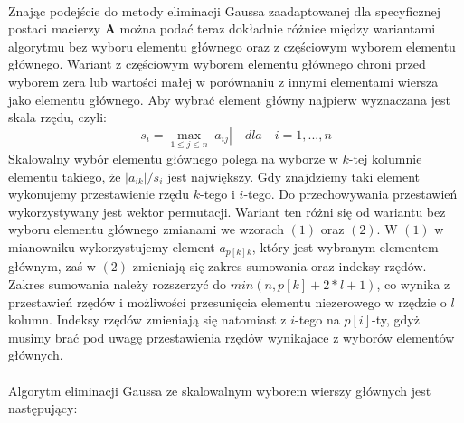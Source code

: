 \documentclass[a4paper]{article}
\begin{document}
\paragraph{}
Znając podejście do metody eliminacji Gaussa zaadaptowanej dla specyficznej postaci macierzy $\mathbf{A}$ można podać teraz dokładnie różnice między wariantami algorytmu bez wyboru elementu głównego oraz z częściowym wyborem elementu głównego.
Wariant z częściowym wyborem elementu głównego chroni przed wyborem zera lub wartości małej w porównaniu z innymi elementami wiersza jako elementu głównego. Aby wybrać element główny najpierw wyznaczana jest skala rzędu, czyli: 
\begin{equation}
s_{i} = \max_{1 \leq j \leq n} |a_{i j }| \quad dla \quad i = 1, ..., n
\end{equation}
Skalowalny wybór elementu głównego polega na wyborze w $k$-tej kolumnie elementu takiego, że $|a_{i k}| / s_{i}$ jest największy. Gdy znajdziemy taki element wykonujemy przestawienie rzędu $k$-tego i $i$-tego. Do przechowywania przestawień wykorzystywany jest wektor permutacji.
Wariant ten różni się od wariantu bez wyboru elementu głównego zmianami we wzorach $(1)$ oraz $(2)$. W $(1)$ w mianowniku wykorzystujemy element $a_{p[k] k}$, który jest wybranym elementem głównym, zaś w $(2)$ zmieniają się zakres sumowania oraz indeksy rzędów. Zakres sumowania należy rozszerzyć do $min(n, p[k] + 2*l + 1)$, co wynika z przestawień rzędów i możliwości przesunięcia elementu niezerowego w rzędzie o $l$ kolumn. Indeksy rzędów zmieniają się natomiast z $i$-tego na $p[i]$-ty, gdyż musimy brać pod uwagę przestawienia rzędów wynikajace z wyborów elementów głównych.

\paragraph{}
Algorytm eliminacji Gaussa ze skalowalnym wyborem wierszy głównych jest następujący:
\end{document}
